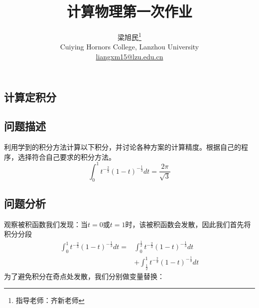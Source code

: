 \documentclass[twoside,twocolumn]{article}
\begin{document}
\begin{CJK*}{UTF8}{gkai}

\setlength{\droptitle}{-4\baselineskip} %
\pretitle{\begin{center}\Huge\bfseries} %
	\posttitle{\end{center}} %
\title{计算物理第一次作业} %
\author{
	\textsc{梁旭民}\thanks{\noindent 指导老师：齐新老师} \\[1ex] %
	\normalsize Cuiying Hornors College, Lanzhou University \\ %
	\normalsize \href{mailto:liangxm15@lzu.edu.cn}{liangxm15@lzu.edu.cn} %
}
\date{}
\renewcommand{\maketitlehookd}{
	\begin{abstract}
		本次计算物理作业有两个问题：第一个问题是求解数值积分，让我们学会处理被积函数在上下限取值处发散的问题，并简单体会不同数值积分方法精确度的优劣；第二个问题是运用二分法、Newton法、弦切法求解一个有无穷个解的超越方程并比较不同数值求解方程根的方法的收敛性快慢
	\end{abstract}
}
\maketitle


\section{计算定积分}
\subsection{问题描述}
利用学到的积分方法计算以下积分，并讨论各种方案的计算精度。根据自己的程序，选择符合自己要求的积分方法。
\begin{equation*}
	\int_{0}^{1}t^{-\frac{2}{3}}(1-t)^{-\frac{1}{3}}dt=\frac{2\pi}{\sqrt{3}}
\end{equation*}
\subsection{问题分析}
观察被积函数我们发现：当$t=0$或$t=1$时，该被积函数会发散，因此我们首先将积分分段
\begin{equation*}
	\begin{aligned}
		\int_{0}^{1}t^{-\frac{2}{3}}(1-t)^{-\frac{1}{3}}dt=&\int_{0}^{\frac{1}{2}}t^{-\frac{2}{3}}(1-t)^{-\frac{1}{3}}dt\\&+\int_{\frac{1}{2}}^{1}t^{-\frac{2}{3}}(1-t)^{-\frac{1}{3}}dt
	\end{aligned}
\end{equation*}
为了避免积分在奇点处发散，我们分别做变量替换：

\end{CJK*}
\end{document}
